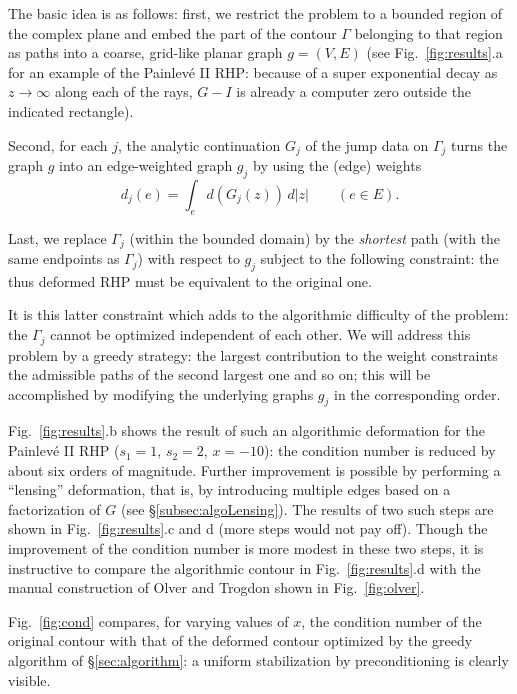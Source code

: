 \documentclass[reqno]{amsart}
\begin{document}
The basic idea is as follows: first, we restrict the problem to a bounded region of the complex plane and
embed the part of the contour $\Gamma$ belonging to that region as paths into a coarse, grid-like planar graph $g = (V,E)$
(see Fig.~\ref{fig:results}.a for an example of the Painlevé II RHP: because of a super exponential decay
as $z\to \infty$ along each of the rays, $G-I$ is already 
a computer zero outside the indicated rectangle). 

Second, for each $j$, the analytic continuation $G_j$ of the jump data on $\Gamma_j$
turns the graph $g$ into an edge-weighted graph $g_j$ by using the (edge) weights
\[
d_j(e) = \int_e d(G_j(z))\, d|z| \qquad (e \in E).
\]

Last, we replace $\Gamma_j$ (within the bounded domain) by the \emph{shortest} path (with the same endpoints as $\Gamma_j$)
with respect to $g_j$ subject to the following constraint: the thus deformed RHP must be equivalent to the original one.

It is this latter constraint which adds to the algorithmic difficulty of the problem: the $\Gamma_j$ cannot be optimized independent
of each other. We will address this problem by a greedy strategy: the largest contribution to the weight
constraints the admissible paths of the second largest one and so on; this will be accomplished by modifying the
underlying graphs $g_j$ in the corresponding order.  

Fig.~\ref{fig:results}.b shows the result of such an algorithmic deformation for the Painlevé II RHP ($s_1=1$, $s_2=2$, $x=-10$): the condition number is reduced by about six orders of magnitude. Further improvement is
possible by performing a ``lensing'' deformation, that is, by introducing multiple edges based on a factorization of $G$ 
(see §\ref{subsec:algoLensing}). The results of two such steps are shown in Fig.~\ref{fig:results}.c and d 
(more steps would not pay off). Though the improvement of the condition number is more modest in these two steps, it is instructive to compare the
algorithmic contour in Fig.~\ref{fig:results}.d with the manual construction of Olver and Trogdon \cite{1205.5604} shown in Fig.~\ref{fig:olver}. 

Fig.~\ref{fig:cond} compares, for varying values of $x$, the condition number of the original contour with that of the deformed contour optimized by the
greedy algorithm of §\ref{sec:algorithm}: a uniform stabilization by preconditioning is clearly visible. 
\end{document}
